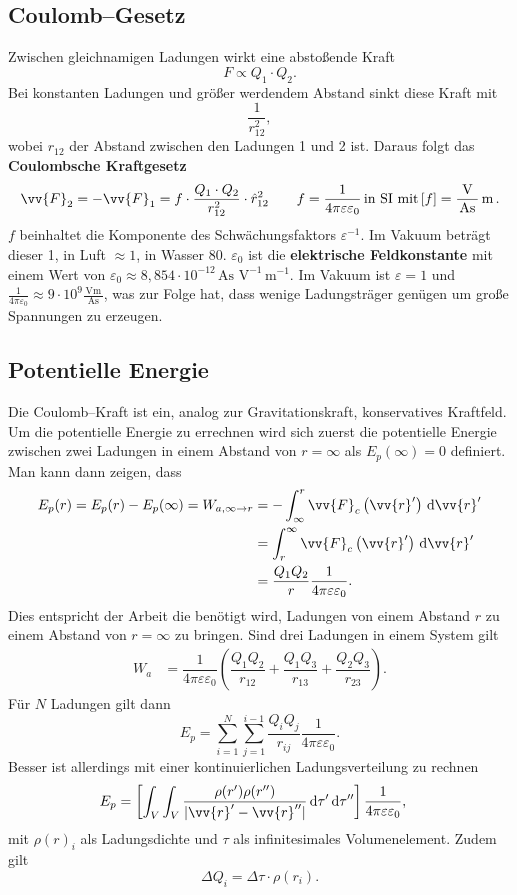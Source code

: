 \documentclass[a4paper,12pt]{article}
\newcommand{\td}{\,\text{d}}
\begin{document}
\subsection{Coulomb--Gesetz}
Zwischen gleichnamigen Ladungen wirkt eine abstoßende Kraft
\[ 
        F\propto Q_1\cdot Q_2
.\]
Bei konstanten Ladungen und größer werdendem Abstand sinkt diese Kraft mit 
\[
        \dfrac{1}{r_{12}^2}
,\]
wobei $r_{12}$ der Abstand zwischen den Ladungen 1 und 2 ist. Daraus folgt das \textbf{Coulombsche Kraftgesetz} 
\[ 
        \vv{F}_2=-\vv{F}_1=f\cdot \dfrac{Q_1\cdot Q_2}{r_{12}^2}\cdot \hat{r}_{12}^2\qquad f=\dfrac{1}{4\pi \varepsilon \varepsilon _0}\,\text{in SI mit}\,[f]=\dfrac{\,\text{V}\,}{\,\text{As}\,}\,\text{m}\,
.\] 
$f$ beinhaltet die Komponente des Schwächungsfaktors $\varepsilon ^{-1}$. Im Vakuum beträgt dieser 1, in Luft $\approx 1$, in Wasser 80. $\varepsilon _0$ ist die \textbf{elektrische Feldkonstante} mit einem Wert von $\varepsilon _0\approx 8,854\cdot 10^{-12}\,\text{As}\,\,\text{V}^{-1}\,\text{m}^{-1}$. Im Vakuum ist $\varepsilon =1$ und $\tfrac{1}{4\pi \varepsilon _0}\approx 9\cdot 10^{9}\tfrac{\,\text{Vm}\,}{\,\text{As}\,}$, was zur Folge hat, dass wenige Ladungsträger genügen um große Spannungen zu erzeugen.

\subsection{Potentielle Energie}
Die Coulomb--Kraft ist ein, analog zur Gravitationskraft, konservatives Kraftfeld. Um die potentielle Energie zu errechnen wird sich zuerst die potentielle Energie zwischen zwei Ladungen in einem Abstand von $r=\infty$ als $E_p(\infty)=0$ definiert. Man kann dann zeigen, dass
\begin{align*}
        E_p(r)=E_p(r)-E_p(\infty)=W_{a,\infty\rightarrow r}&=-\int_{\infty}^{r}\vv{F}_c\left(\vv{r}'\right)\td \vv{r}'\\
                                                           &=\int_{r}^{\infty}\vv{F}_c\left(\vv{r}'\right)\td \vv{r}'\\
                                                           &=\dfrac{Q_1Q_2}{r}\dfrac{1}{4\pi \varepsilon \varepsilon _0}
.\end{align*}
Dies entspricht der Arbeit die benötigt wird, Ladungen von einem Abstand $r$ zu einem Abstand von $r=\infty$ zu bringen. Sind drei Ladungen in einem System gilt
\begin{align*}
        W_a&=\dfrac{1}{4\pi \varepsilon \varepsilon _0}\left(\dfrac{Q_1Q_2}{r_{12}}+\dfrac{Q_1Q_3}{r_{13}}+\dfrac{Q_2Q_3}{r_{23}}\right)
.\end{align*}
Für $N$ Ladungen gilt dann
\[ 
        E_p=\sum_{i=1}^{N}\sum_{j=1}^{i-1}\dfrac{Q_iQ_j}{r_{ij}}\dfrac{1}{4\pi \varepsilon \varepsilon _0}
.\] 
Besser ist allerdings mit einer kontinuierlichen Ladungsverteilung zu rechnen
\begin{align*}
        E_p&=\left[\int_{V}^{}\int_{V}^{}\dfrac{\rho (r')\rho (r'')}{|\vv{r}'-\vv{r}''|}\td \tau '\td \tau ''\right]\dfrac{1}{4\pi \varepsilon \varepsilon _0}
,\end{align*}
mit $\rho (r)_i$ als Ladungsdichte und $\tau $ als infinitesimales Volumenelement. Zudem gilt
\[ 
        \Delta Q_i=\Delta \tau \cdot \rho (r_i)
.\] 
\end{document}
